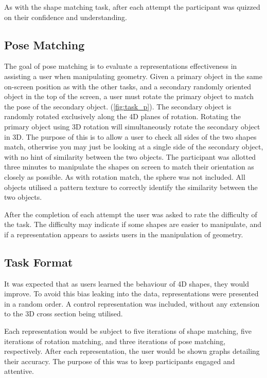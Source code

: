 \documentclass{l4proj}
\begin{document}
As with the shape matching task, after each attempt the participant was quizzed on their confidence and understanding.

\subsection*{Pose Matching}

The goal of pose matching is to evaluate a representations effectiveness in assisting a user when manipulating geometry.
Given a primary object in the same on-screen position as with the other tasks, and a secondary randomly oriented object in the top of the screen, a user must rotate the primary object to match the pose of the secondary object. (\cref{fig:task_p}).
The secondary object is randomly rotated exclusively along the 4D planes of rotation. 
Rotating the primary object using 3D rotation will simultaneously rotate the secondary object in 3D. The purpose of this is to allow a user to check all sides of the two shapes match, otherwise you may just be looking at a single side of the secondary object, with no hint of similarity between the two objects.
The participant was allotted three minutes to manipulate the shapes on screen to match their orientation as closely as possible.
As with rotation match, the sphere was not included. All objects utilised a pattern texture to correctly identify the similarity between the two objects.

After the completion of each attempt the user was asked to rate the difficulty of the task. The difficulty may indicate if some shapes are easier to manipulate, and if a representation appears to assists users in the manipulation of geometry.

\subsection*{Task Format}

It was expected that as users learned the behaviour of 4D shapes, they would improve. To avoid this bias leaking into the data, representations were presented in a random order. A control representation was included, without any extension to the 3D cross section being utilised.

Each representation would be subject to five iterations of shape matching, five iterations of rotation matching, and three iterations of pose matching, respectively.
After each representation, the user would be shown graphs detailing their accuracy. The purpose of this was to keep participants engaged and attentive.
\end{document}
